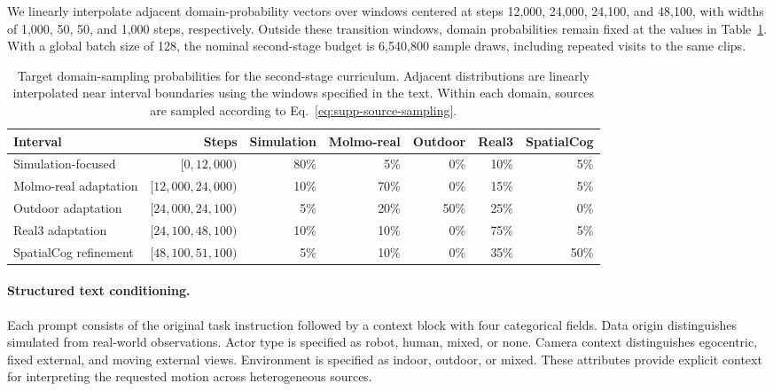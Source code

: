 We linearly interpolate adjacent domain-probability vectors over windows
centered at steps 12,000, 24,000, 24,100, and 48,100, with widths of
1,000, 50, 50, and 1,000 steps, respectively.
Outside these transition windows, domain probabilities remain fixed at
the values in Table~\ref{tab:supp-curriculum}.
With a global batch size of 128, the nominal second-stage budget is
6,540,800 sample draws, including repeated visits to the same clips.

\begin{table}[t]
\centering
\scriptsize
\setlength{\tabcolsep}{3pt}
\renewcommand{\arraystretch}{1.1}
\begin{tabular*}{\linewidth}
{@{\extracolsep{\fill}}lrrrrrr@{}}
\toprule
Interval
& Steps
& Simulation
& Molmo-real
& Outdoor
& Real3
& SpatialCog \\
\midrule
Simulation-focused
& $[0,12{,}000)$
& 80\% & 5\% & 0\% & 10\% & 5\% \\

Molmo-real adaptation
& $[12{,}000,24{,}000)$
& 10\% & 70\% & 0\% & 15\% & 5\% \\

Outdoor adaptation
& $[24{,}000,24{,}100)$
& 5\% & 20\% & 50\% & 25\% & 0\% \\

Real3 adaptation
& $[24{,}100,48{,}100)$
& 10\% & 10\% & 0\% & 75\% & 5\% \\

SpatialCog refinement
& $[48{,}100,51{,}100)$
& 5\% & 10\% & 0\% & 35\% & 50\% \\
\bottomrule
\end{tabular*}
\caption{Target domain-sampling probabilities for the second-stage
curriculum. Adjacent distributions are linearly interpolated near interval
boundaries using the windows specified in the text. Within each domain,
sources are sampled according to Eq.~\eqref{eq:supp-source-sampling}.}
\label{tab:supp-curriculum}
\end{table}

\paragraph{Structured text conditioning.}
Each prompt consists of the original task instruction followed by a
context block with four categorical fields.
Data origin distinguishes simulated from real-world observations.
Actor type is specified as robot, human, mixed, or none.
Camera context distinguishes egocentric, fixed external, and moving
external views. Environment is specified as indoor, outdoor, or mixed.
These attributes provide explicit context for interpreting the requested
motion across heterogeneous sources.

